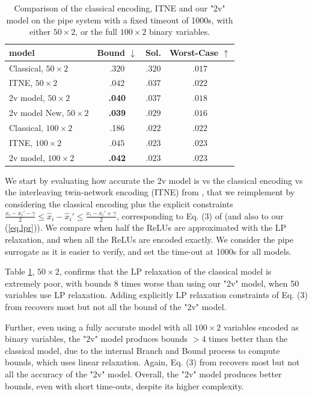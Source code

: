 \begin{table}[b!]
	\centering
	\begin{tabular}{||l|c|c|c||}\hline\hline
		model &        Bound $\downarrow$ &  Sol. &      Worst-Case $\uparrow$ \\\hline \hline
	Classical, $50 \times 2$ &    $.320$ &  $.320$ & $.017$ 
    \\\hline
	ITNE, $50 \times 2$ &    $.042$ &  $.037$ & $.022$
	\\ \hline
    2v model, $50 \times 2$ &    {\bf .040} &  $.037$ &  $.018$ 
    \\\hline \hline
     2v model New, $50 \times 2$ &    {\bf .039} &  $.029$ &  $.016$ 
    \\\hline \hline
    Classical, $100 \times 2$ &  .186  &  $.022$ & $.022$ 
    \\\hline
	ITNE, $100 \times 2$ &    $.045$ &  $.023$ & .023
    \\\hline
	2v model, $100 \times 2$&     {\bf .042} &  $.023$ &   .023 
    \\\hline \hline
	\end{tabular}
	\caption{Comparison of the classical encoding, ITNE and our "2v" model on the pipe system with a fixed timeout of 1000s, with either $50 \times 2$, 
    or the full $100 \times 2$ binary variables.}
    \label{table.classical}
\end{table}

We start by evaluating how accurate the 2v model is vs the classical encoding vs the interleaving twin-network encoding (ITNE) from \cite{lipshitz,ITNE}, that we reimplement by considering the classical encoding plus the explicit constraints $\frac{x_i-x_i' - \gamma}{2} \leq \hat{x}_i-\hat{x}_i' \leq \frac{x_i-x_i' + \gamma}{2}$, corresponding to Eq. (3) of \cite{ITNE} (and also to our (\ref{eq.lpr})). We compare when half the ReLUs are approximated with the LP relaxation, and when all the ReLUs are encoded exactly. We consider the pipe surrogate as it is easier to verify, and set the time-out at 1000s for all models.


Table \ref{table.classical}, $50 \times 2$, confirms that the LP relaxation of the classical model is extremely poor, with bounds $8$ times worse than using our "2v" model, when 50 variables use LP relaxation. Adding explicitly LP relaxation constraints of Eq. (3) from \cite{ITNE} recovers most but not all the bound of the "2v" model.

Further, even using a fully accurate model with all $100 \times 2$ variables encoded as binary variables, the "2v" model produces bounds $>4$ times better than the classical model, due to the internal Branch and Bound process to compute bounds, which uses linear relaxation. Again, 
Eq. (3) from \cite{ITNE} recovers most but not all the accuracy of the "2v" model.
Overall, the "2v" model produces better bounds, even with short time-outs, despite its higher complexity.

